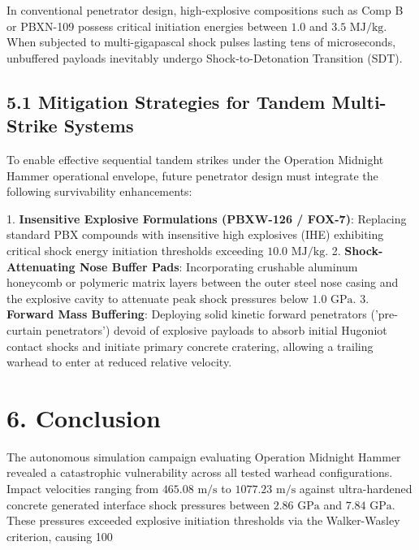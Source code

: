 \documentclass[journal,10pt,twocolumn]{IEEEtran}
\begin{document}
In conventional penetrator design, high-explosive compositions such as Comp B or PBXN-109 possess critical initiation energies between $1.0$ and $3.5\text{ MJ/kg}$. When subjected to multi-gigapascal shock pulses lasting tens of microseconds, unbuffered payloads inevitably undergo Shock-to-Detonation Transition (SDT).

\subsection{5.1 Mitigation Strategies for Tandem Multi-Strike Systems}

To enable effective sequential tandem strikes under the Operation Midnight Hammer operational envelope, future penetrator design must integrate the following survivability enhancements:

1. \textbf{Insensitive Explosive Formulations (PBXW-126 / FOX-7)}: Replacing standard PBX compounds with insensitive high explosives (IHE) exhibiting critical shock energy initiation thresholds exceeding $10.0\text{ MJ/kg}$.
2. \textbf{Shock-Attenuating Nose Buffer Pads}: Incorporating crushable aluminum honeycomb or polymeric matrix layers between the outer steel nose casing and the explosive cavity to attenuate peak shock pressures below $1.0\text{ GPa}$.
3. \textbf{Forward Mass Buffering}: Deploying solid kinetic forward penetrators ('pre-curtain penetrators') devoid of explosive payloads to absorb initial Hugoniot contact shocks and initiate primary concrete cratering, allowing a trailing warhead to enter at reduced relative velocity.



\section{6. Conclusion}

The autonomous simulation campaign evaluating Operation Midnight Hammer revealed a catastrophic vulnerability across all tested warhead configurations. Impact velocities ranging from $465.08\text{ m/s}$ to $1077.23\text{ m/s}$ against ultra-hardened concrete generated interface shock pressures between $2.86\text{ GPa}$ and $7.84\text{ GPa}$. These pressures exceeded explosive initiation thresholds via the Walker-Wasley criterion, causing 100%
\end{document}
